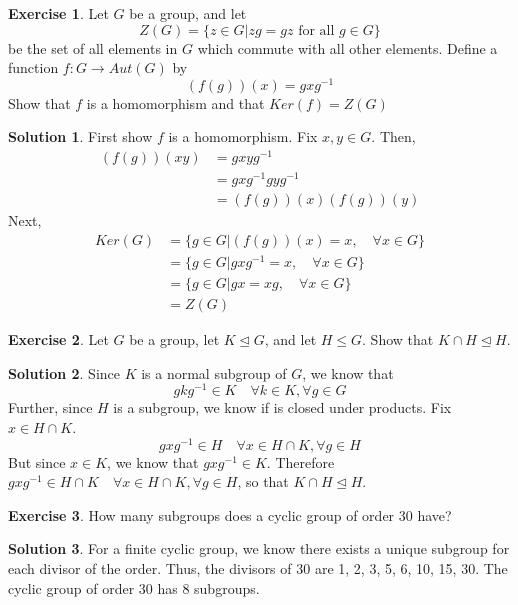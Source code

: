 \documentclass[12pt]{article}
\theoremstyle{definition}
\newtheorem{exercise}{Exercise}
\theoremstyle{definition}
\newtheorem{solution}{Solution}
\begin{document}
\begin{exercise}
Let $G$ be a group, and let
\begin{equation}
	Z(G) = \{ z \in G | zg = gz \text{ for all } g \in G\}
\end{equation}
be the set of all elements in $G$ which commute with all other elements. Define a function $f: G\to Aut(G)$ by 
\begin{equation}
	(f(g))(x) = gxg^{-1}
\end{equation}
Show that $f$ is a homomorphism and that $Ker(f) = Z(G)$
\end{exercise}
\begin{solution}
First show $f$ is a homomorphism. Fix $x,y \in G$. Then,
\begin{align*}
	(f(g))(xy) &= gxyg^{-1} \\
	&=gxg^{-1}gyg^{-1} \\
	&=(f(g))(x)(f(g))(y)
\end{align*}
Next, 
\begin{align*}
	Ker(G) &= \{g \in G | (f(g))(x) = x, \quad \forall x \in G \} \\
	&= \{g \in G |  gxg^{-1} = x, \quad \forall x \in G \} \\
	&= \{g \in G |  gx = xg, \quad \forall x \in G \} \\
	&= Z(G)
\end{align*}
\end{solution}

\begin{exercise}
Let $G$ be a group, let $K \trianglelefteq G$, and let $H \leq G$. Show that $K \cap H \trianglelefteq H$.
\end{exercise}
\begin{solution}
Since $K$ is a normal subgroup of $G$, we know that
\begin{equation}
	gkg^{-1} \in K \quad \forall k \in K, \forall g \in G
\end{equation}
Further, since $H$ is a subgroup, we know if is closed under products. Fix $x \in H \cap K$. 
\begin{equation}
	gxg^{-1} \in H \quad \forall x \in H \cap K, \forall g \in H
\end{equation}
But since $x \in K$, we know that $gxg^{-1} \in K$. Therefore $gxg^{-1} \in H \cap K \quad \forall x \in H \cap K, \forall g \in H$, so that $K \cap H \trianglelefteq H$.
\end{solution}

\begin{exercise}
How many subgroups does a cyclic group of order 30 have?
\end{exercise}
\begin{solution}
For a finite cyclic group, we know there exists a unique subgroup for each divisor of the order. Thus, the divisors of 30 are 1, 2, 3, 5, 6, 10, 15, 30. The cyclic group of order 30 has 8 subgroups. 
\end{solution}
\end{document}
